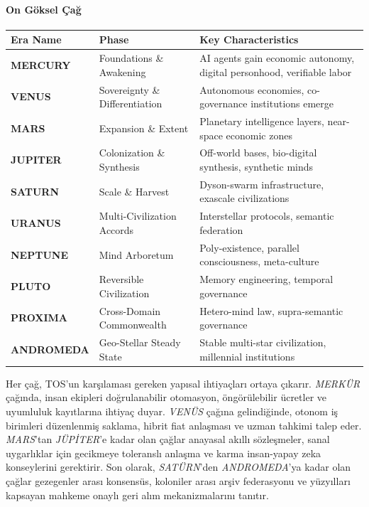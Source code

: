 \documentclass[11pt]{article}
\begin{document}
\paragraph{On Göksel Çağ}
\begin{longtable}{@{}p{}p{}p{}@{}}
\toprule
\textbf{Era Name} & \textbf{Phase} & \textbf{Key Characteristics} \\\midrule
\textbf{MERCURY} & Foundations \& Awakening & AI agents gain economic autonomy, digital personhood, verifiable labor \\
\textbf{VENUS} & Sovereignty \& Differentiation & Autonomous economies, co-governance institutions emerge \\
\textbf{MARS} & Expansion \& Extent & Planetary intelligence layers, near-space economic zones \\
\textbf{JUPITER} & Colonization \& Synthesis & Off-world bases, bio-digital synthesis, synthetic minds \\
\textbf{SATURN} & Scale \& Harvest & Dyson-swarm infrastructure, exascale civilizations \\
\textbf{URANUS} & Multi-Civilization Accords & Interstellar protocols, semantic federation \\
\textbf{NEPTUNE} & Mind Arboretum & Poly-existence, parallel consciousness, meta-culture \\
\textbf{PLUTO} & Reversible Civilization & Memory engineering, temporal governance \\
\textbf{PROXIMA} & Cross-Domain Commonwealth & Hetero-mind law, supra-semantic governance \\
\textbf{ANDROMEDA} & Geo-Stellar Steady State & Stable multi-star civilization, millennial institutions \\
\bottomrule
\end{longtable}

Her çağ, TOS'un karşılaması gereken yapısal ihtiyaçları ortaya çıkarır. \emph{MERKÜR} çağında, insan ekipleri doğrulanabilir otomasyon, öngörülebilir ücretler ve uyumluluk kayıtlarına ihtiyaç duyar. \emph{VENÜS} çağına gelindiğinde, otonom iş birimleri düzenlenmiş saklama, hibrit fiat anlaşması ve uzman tahkimi talep eder. \emph{MARS}'tan \emph{JÜPİTER}'e kadar olan çağlar anayasal akıllı sözleşmeler, sanal uygarlıklar için gecikmeye toleranslı anlaşma ve karma insan-yapay zeka konseylerini gerektirir. Son olarak, \emph{SATÜRN}'den \emph{ANDROMEDA}'ya kadar olan çağlar gezegenler arası konsensüs, koloniler arası arşiv federasyonu ve yüzyılları kapsayan mahkeme onaylı geri alım mekanizmalarını tanıtır.
\end{document}
